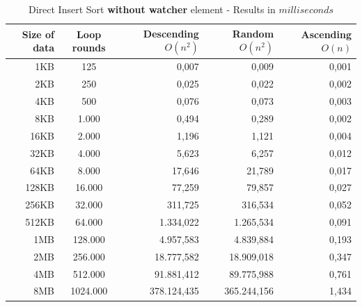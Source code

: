 \documentclass[11pt]{amsart}
\begin{document}
\begin{table}[htdp]
	\caption{Direct Insert Sort \textbf{without watcher} element - Results in $milliseconds$}
	\begin{tabular}{|r|c|r|r|r|} \hline
		Size of data & Loop rounds & \parbox[c]{3.5cm}{Descending \\ $O(n^2)$} & \parbox[c]{3.5cm}{Random \\$O(n^2)$} & \parbox[c]{3.5cm}{Ascending \\ $O(n)$} \\ \hline
		1KB & 125 & 0,007 & 0,009 & 0,001 \\ \hline
		2KB & 250 & 0,025 & 0,022 & 0,002 \\ \hline
		4KB & 500 & 0,076 & 0,073 & 0,003 \\ \hline
		8KB & 1.000 & 0,494 & 0,289 & 0,002 \\ \hline
		16KB & 2.000 & 1,196 & 1,121 & 0,004 \\ \hline
		32KB & 4.000 & 5,623 & 6,257 & 0,012 \\ \hline
		64KB & 8.000 & 17,646 & 21,789 & 0,017 \\ \hline
		128KB & 16.000 & 77,259 & 79,857 & 0,027 \\ \hline
		256KB & 32.000 & 311,725 & 316,534 & 0,052 \\ \hline
		512KB & 64.000 & 1.334,022 & 1.265,534 & 0,091 \\ \hline
		1MB & 128.000 &  4.957,583 & 4.839,884 & 0,193 \\ \hline
		2MB & 256.000 & 18.777,582 & 18.909,018 & 0,347 \\ \hline
		4MB & 512.000 & 91.881,412 & 89.775,988 & 0,761 \\ \hline
		8MB & 1024.000 & 378.124,435 & 365.244,156 & 1,434 \\ \hline
	\end{tabular}
	\label{default}
\end{table}%
\clearpage
\end{document}
